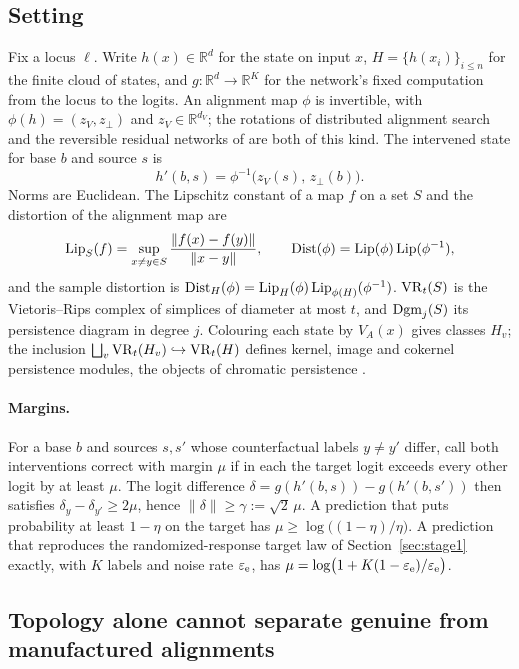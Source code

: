 \documentclass[11pt,a4paper]{article}
\newcommand{\eps}{\varepsilon}
\begin{document}
\subsection{Setting}
\label{app:topo-setup}

Fix a locus $\ell$. Write $h(x)\in\mathbb R^d$ for the state on input $x$,
$H=\{h(x_i)\}_{i\le n}$ for the finite cloud of states, and
$g:\mathbb R^d\to\mathbb R^K$ for the network's fixed computation from the
locus to the logits. An alignment map $\phi$ is invertible, with
$\phi(h)=(z_V,z_\perp)$ and $z_V\in\mathbb R^{d_V}$; the rotations of
distributed alignment search and the reversible residual networks of
\cite{sutter2025} are both of this kind. The intervened state for base $b$ and
source $s$ is
\begin{equation}
h'(b,s)=\phi^{-1}\bigl(z_V(s),\,z_\perp(b)\bigr).
\label{eq:topo-interv}
\end{equation}
Norms are Euclidean. The Lipschitz constant of a map $f$ on a set $S$ and the
distortion of the alignment map are
\[
\operatorname{Lip}_S(f)=\sup_{x\neq y\in S}\frac{\|f(x)-f(y)\|}{\|x-y\|},\qquad
\operatorname{Dist}(\phi)=\operatorname{Lip}(\phi)\operatorname{Lip}(\phi^{-1}),
\]
and the sample distortion is
$\operatorname{Dist}_H(\phi)=\operatorname{Lip}_H(\phi)\operatorname{Lip}_{\phi(H)}(\phi^{-1})$. $\mathrm{VR}_t(S)$ is the
Vietoris--Rips complex of simplices of diameter at most $t$, and
$\operatorname{Dgm}_j(S)$ its persistence diagram in degree $j$. Colouring each state by
$V_A(x)$ gives classes $H_v$; the inclusion
$\bigsqcup_v\mathrm{VR}_t(H_v)\hookrightarrow\mathrm{VR}_t(H)$ defines kernel, image and
cokernel persistence modules, the objects of chromatic persistence
\cite{cultrera2025chromatic}.

\paragraph{Margins.} For a base $b$ and sources $s,s'$ whose counterfactual
labels $y\neq y'$ differ, call both interventions correct with margin $\mu$ if
in each the target logit exceeds every other logit by at least $\mu$. The
logit difference $\delta=g(h'(b,s))-g(h'(b,s'))$ then satisfies
$\delta_y-\delta_{y'}\ge2\mu$, hence $\|\delta\|\ge\gamma:=\sqrt2\,\mu$. A
prediction that puts probability at least $1-\eta$ on the target has
$\mu\ge\log\bigl((1-\eta)/\eta\bigr)$. A prediction that reproduces the
randomized-response target law of Section~\ref{sec:stage1} exactly, with $K$
labels and noise rate $\eps_{\rm e}$, has
$\mu=\log\bigl(1+K(1-\eps_{\rm e})/\eps_{\rm e}\bigr)$.

\subsection{Topology alone cannot separate genuine from manufactured alignments}
\label{app:topo-blind}
\end{document}
